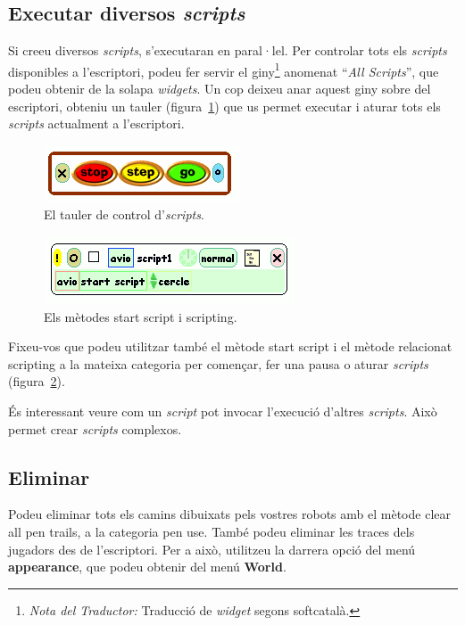 \subsection{Executar diversos \emph{scripts}}
Si creeu diversos \emph{scripts}, s'executaran en paral·lel. Per controlar tots els \emph{scripts} disponibles a l'escriptori, podeu fer servir el giny\footnote{\emph{Nota del Traductor:} Traducció de \emph{widget} segons softcatalà.} anomenat ``\emph{All Scripts}'', que podeu obtenir de la solapa \emph{widgets}. Un cop deixeu anar aquest giny sobre del escriptori, obteniu un tauler (figura~\ref{fig2448}) que us permet executar i aturar tots els \emph{scripts} actualment a l'escriptori.
\begin{figure}[h!]
\begin{center}
\includegraphics[scale=0.8]{Imatges/figura24-48}
\end{center}
\caption{El tauler de control d'\emph{scripts}.}
\label{fig2448}
\end{figure}
\begin{figure}[h!]
\begin{center}
\includegraphics[scale=0.6]{Imatges/figura24-49}
\end{center}
\caption{Els mètodes \textsf{\upshape start script} i \textsf{\upshape scripting}.}
\label{fig2449}
\end{figure}

Fixeu-vos que podeu utilitzar també el mètode \textsf{start script} i el mètode relacionat \textsf{scripting} a la mateixa categoria per començar, fer una pausa o aturar \emph{scripts} (figura~\ref{fig2449}).

És interessant veure com un \emph{script} pot invocar l'execució d'altres \emph{scripts}. Això permet crear \emph{scripts} complexos.

\subsection{Eliminar}
Podeu eliminar tots els camins dibuixats pels vostres robots amb el mètode \textsf{clear all pen trails}, a la categoria \textsf{pen use}. També podeu eliminar les traces dels jugadors des de l'escriptori. Per a això, utilitzeu la darrera opció del menú \textbf{appearance}, que podeu obtenir del menú \textbf{World}.

